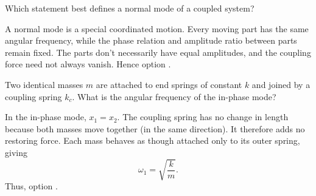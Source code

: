 \begin{quizquestion}[
  id=phy104-nm-006,
  topic=normal-modes,
  difficulty=foundation,
  marks=1,
  correct=B,
  tags={normal-mode,coupled-system,phase-relation},
  outcome={Recognise the defining features of a normal mode}
]
  Which statement best defines a normal mode of a coupled system?
\end{quizquestion}
\begin{quizsolution}
  A normal mode is a special coordinated motion. Every moving part has the same angular frequency, while the phase relation and amplitude ratio between parts remain fixed. The parts don't necessarily have equal amplitudes, and the coupling force need not always vanish. Hence option \textbf{\quizcorrectletter}.
\end{quizsolution}

\begin{quizquestion}[
  id=phy104-nm-007,
  topic=normal-modes,
  difficulty=foundation,
  marks=1,
  correct=A,
  tags={coupled-oscillators,in-phase,normal-frequency},
  outcome={Identify the in-phase normal frequency}
]
  Two identical masses \(m\) are attached to end springs of constant \(k\) and joined by a coupling spring \(k_c\). What is the angular frequency of the in-phase mode?
\end{quizquestion}
\begin{quizsolution}
  In the in-phase mode, \(x_1=x_2\). The coupling spring has no change in length because both masses move together (in the same direction). It therefore adds no restoring force. Each mass behaves as though attached only to its outer spring, giving
    \[
      \omega_1=\sqrt{\frac{k}{m}}.
    \]
    Thus, option \textbf{\quizcorrectletter}.
\end{quizsolution}

